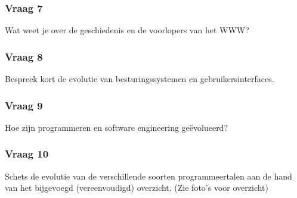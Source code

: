 \documentclass[../main.tex]{subfiles}
\begin{document}
\subsubsection{Vraag 7}
\begin{question}
Wat weet je over de geschiedenis en de voorlopers van het WWW?
\end{question}

\subsubsection{Vraag 8}
\begin{question}
Bespreek kort de evolutie van besturingssystemen en gebruikersinterfaces.
\end{question}

\subsubsection{Vraag 9}
\begin{question}
Hoe zijn programmeren en software engineering geëvolueerd?
\end{question}

\subsubsection{Vraag 10}
\begin{question}
Schets de evolutie van de verschillende soorten programmeertalen aan de hand van het bijgevoegd (vereenvoudigd) overzicht. (Zie foto's voor overzicht)
\end{question}
\end{document}
